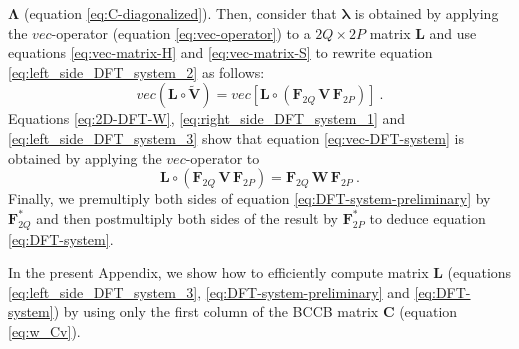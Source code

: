 \documentclass[manuscript,revised]{geophysics}
\begin{document}
$\boldsymbol{\Lambda}$ (equation \ref{eq:C-diagonalized}).
Then, consider that $\boldsymbol{\lambda}$ is obtained by applying the $vec$-operator 
(equation \ref{eq:vec-operator}) to a $2Q \times 2P$ matrix $\mathbf{L}$ and use 
equations \ref{eq:vec-matrix-H} and \ref{eq:vec-matrix-S} to rewrite equation 
\ref{eq:left_side_DFT_system_2} as follows:
\begin{equation}
vec \left( \mathbf{L} \circ \tilde{\mathbf{V}} \right) = 
vec \left[ \mathbf{L} \circ 
\left( \mathbf{F}_{2Q} \, \mathbf{V} \, \mathbf{F}_{2P} \right) 
\right] \: .
\label{eq:left_side_DFT_system_3}
\end{equation}
Equations \ref{eq:2D-DFT-W}, \ref{eq:right_side_DFT_system_1} and 
\ref{eq:left_side_DFT_system_3} show that equation \ref{eq:vec-DFT-system}
is obtained by applying the $vec$-operator to 
\begin{equation}
\mathbf{L} \circ \left( \mathbf{F}_{2Q} \, \mathbf{V} \, \mathbf{F}_{2P} \right) = 
\mathbf{F}_{2Q} \, \mathbf{W} \, \mathbf{F}_{2P} \: .
\label{eq:DFT-system-preliminary}
\end{equation}
Finally, we premultiply both sides of equation \ref{eq:DFT-system-preliminary} by 
$\mathbf{F}_{2Q}^{\ast}$ and then postmultiply both sides of the result by 
$\mathbf{F}_{2P}^{\ast}$ to deduce equation \ref{eq:DFT-system}.



In the present Appendix, we show how to efficiently compute matrix $\mathbf{L}$
(equations \ref{eq:left_side_DFT_system_3}, \ref{eq:DFT-system-preliminary} 
and \ref{eq:DFT-system}) by using only the first column of the BCCB matrix
$\mathbf{C}$ (equation \ref{eq:w_Cv}).
\end{document}
